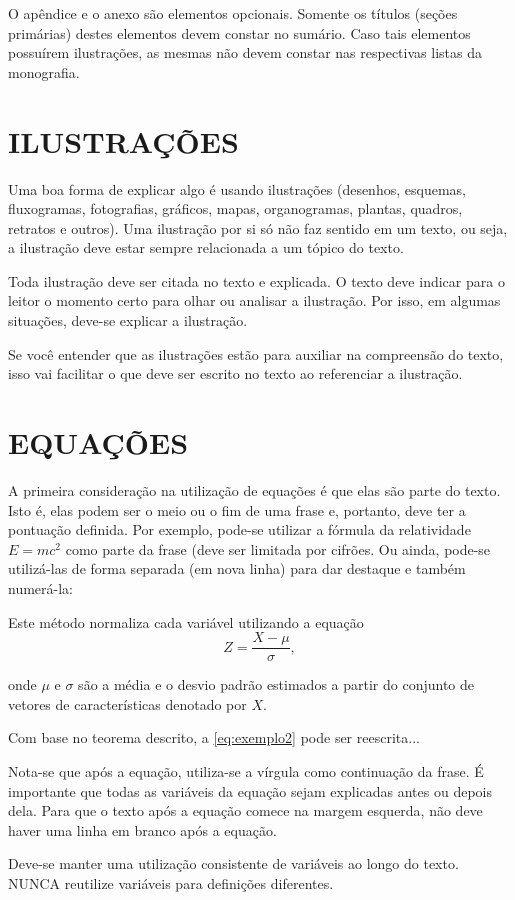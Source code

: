 O apêndice e o anexo são elementos opcionais. Somente os títulos (seções primárias) destes elementos devem constar no sumário. Caso tais elementos possuírem ilustrações, as mesmas não devem constar nas respectivas listas da monografia. 

\section{ILUSTRAÇÕES}

Uma boa forma de explicar algo é usando ilustrações (desenhos, esquemas, fluxogramas, fotografias, gráficos, mapas, organogramas, plantas, quadros, retratos e outros). Uma ilustração por si só não faz sentido em um texto, ou seja, a ilustração deve estar sempre relacionada a um tópico do texto. 

Toda ilustração deve ser citada no texto e explicada. O texto deve indicar para o leitor o momento certo para olhar ou analisar a ilustração. Por isso, em algumas situações, deve-se explicar a ilustração. 

Se você entender que as ilustrações estão para auxiliar na compreensão do texto, isso vai facilitar o que deve ser escrito no texto ao referenciar a ilustração. 

\section{EQUAÇÕES}

A primeira consideração na utilização de equações é que elas são parte do texto. Isto é, elas podem ser o meio ou o fim de uma frase e, portanto, deve ter a pontuação definida. Por exemplo, pode-se utilizar a fórmula da relatividade $E = mc^2$ como parte da frase (deve ser limitada por cifrões. Ou ainda, pode-se utilizá-las de forma separada (em nova linha) para dar destaque e também numerá-la: 
\begin{citacao}
Este método normaliza cada variável utilizando a equação
\begin{equation}\label{eq:exemplo2}
Z=\frac{X-\mu}{\sigma},
\end{equation}

onde $\mu$ e $\sigma$ são a média e o desvio padrão estimados a partir do conjunto de vetores de características denotado por $X$.

Com base no teorema descrito, a \autoref{eq:exemplo2} pode ser reescrita...

\end{citacao}

Nota-se que após a equação, utiliza-se a vírgula como continuação da frase. É importante que todas as variáveis da equação sejam explicadas antes ou depois dela. Para que o texto após a equação comece na margem esquerda, não deve haver uma linha em branco após a equação.

Deve-se manter uma utilização consistente de variáveis ao longo do texto. NUNCA reutilize variáveis para definições diferentes. 




